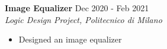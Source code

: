 
\noindent
\textbf{Image Equalizer} \hfill Dec 2020 - Feb 2021 \\
\textit{Logic Design Project, Politecnico di Milano}
\begin{itemize}[noitemsep,topsep=0pt]
    \item Designed an image equalizer 
\end{itemize}

